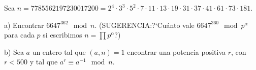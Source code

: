 




\begin{problem} [9]
Sea
$n=7785562197230017200=2^4\cdot3^3\cdot5^2\cdot7\cdot11\cdot13\cdot19\cdot31
\cdot37\cdot41\cdot61\cdot73\cdot181$.

a) Encontrar $6647^{362}\mod n$. (SUGERENCIA:?`Cuánto vale $6647^{360}\mod
p^{\alpha}$ para cada $p$ si escribimos $n=\prod p^{\alpha}$?)

b) Sea $a$ un entero tal que $(a,n)=1$ encontrar una potencia positiva $r$,
con $r<500$ y tal que $a^r\equiv a^{-1}\mod n$.

\solution

\end{problem}
